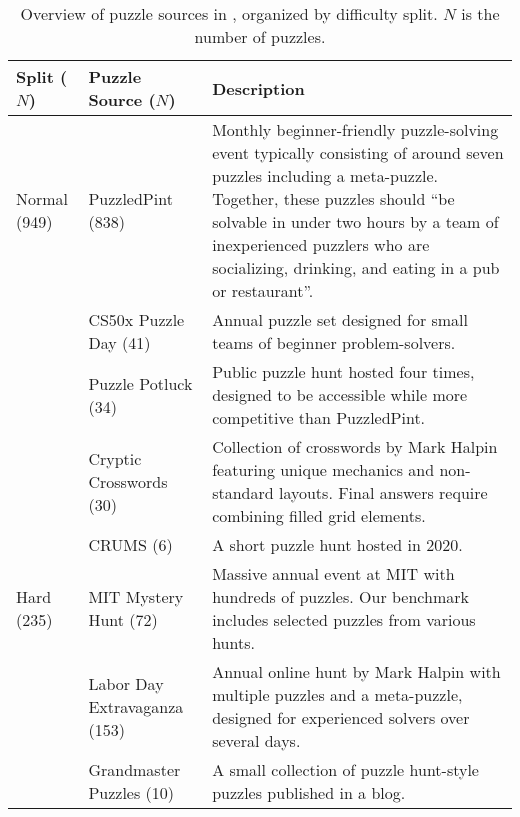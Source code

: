 
\begin{table}[t]
\caption{Overview of puzzle sources in \enigmaeval, organized by difficulty split. $N$ is the number of puzzles.}
\label{tab:puzzle_sources}
\begin{tabular}{p{1.5cm}p{3.7cm}p{11cm}}
\toprule
\textbf{Split ($N$)} & \textbf{Puzzle Source ($N$)} & \textbf{Description} \\
\midrule
Normal (949) & PuzzledPint (838) \citep{puzzledpint} & Monthly beginner-friendly puzzle-solving event typically consisting of around seven puzzles including a meta-puzzle. Together, these puzzles should ``be solvable in under two hours by a team of inexperienced puzzlers who are socializing, drinking, and eating in a pub or restaurant''\footnotemark. \\
\cmidrule{2-3}
& CS50x Puzzle Day (41) \citep{cs50x} & Annual puzzle set designed for small teams of beginner problem-solvers. \\
\cmidrule{2-3}
& Puzzle Potluck (34) \citep{puzzlepotluck} & Public puzzle hunt hosted four times, designed to be accessible while more competitive than PuzzledPint. \\
\cmidrule{2-3}
& Cryptic Crosswords (30) \citep{markhalpinpuzzles} & Collection of crosswords by Mark Halpin featuring unique mechanics and non-standard layouts. Final answers require combining filled grid elements. \\
\cmidrule{2-3}
& CRUMS (6) \citep{crums} & A short puzzle hunt hosted in 2020. \\
\midrule
Hard (235) & MIT Mystery Hunt (72) \citep{mitmysteryhunt} & Massive annual event at MIT with hundreds of puzzles. Our benchmark includes selected puzzles from various hunts. \\
\cmidrule{2-3}
& Labor Day Extravaganza (153) \citep{markhalpinpuzzles} & Annual online hunt by Mark Halpin with multiple puzzles and a meta-puzzle, designed for experienced solvers over several days. \\
\cmidrule{2-3}
& Grandmaster Puzzles (10) \citep{gmpuzzles} & A small collection of puzzle hunt-style puzzles published in a blog. \\
\bottomrule
\end{tabular}
\end{table}

